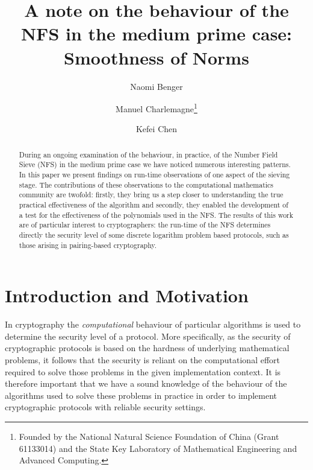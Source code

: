 \documentclass[a4paper, 12pt, envcountsect, runningheads]{llncs}
\numberwithin{figure}{section}
\numberwithin{equation}{section}
\begin{document}
\title{A note on the behaviour of the NFS in the medium prime case: Smoothness of Norms}

\author{Naomi Benger
\and Manuel Charlemagne\thanks{Founded by the National Natural Science Foundation of China (Grant 61133014) and the State Key Laboratory of Mathematical Engineering and Advanced Computing.}
\and Kefei Chen}

\maketitle
\begin{abstract}
During an ongoing examination of the behaviour, in practice, of the Number Field Sieve (NFS) in the medium prime case we have noticed numerous interesting patterns. In this paper we present findings on run-time observations of one aspect of the sieving stage. The contributions of these observations to the computational mathematics community are twofold: firstly, they bring us a step closer to understanding the true practical effectiveness of the algorithm and secondly, they enabled the development of a test for the effectiveness of the polynomials used in the NFS. The results of this work are of particular interest to cryptographers: the run-time of the NFS determines directly the security level of some discrete logarithm problem based protocols, such as those arising in pairing-based cryptography.
\end{abstract}
\section{Introduction and Motivation}
In cryptography the {\em computational} behaviour of particular algorithms is used to determine the security level of a protocol. More specifically, as the security of cryptographic protocols is based on the hardness of underlying mathematical problems, it follows that the security is reliant on the computational effort required to solve those problems in the given implementation context. It is therefore important that we have a sound knowledge of the behaviour of the algorithms used to solve these problems in practice in order to implement cryptographic protocols with reliable security settings.
\end{document}
